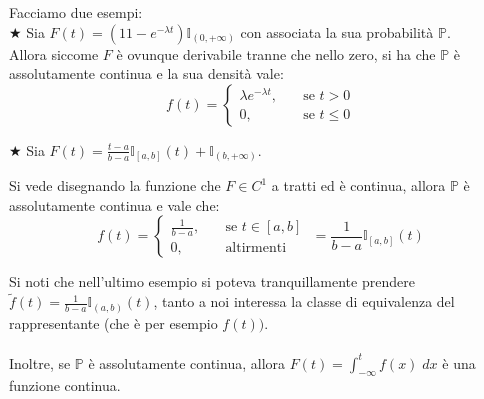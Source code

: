 \begin{esempio}
    Facciamo due esempi:\\
    \(\bigstar\) Sia $F(t) = (11 - e^{-\lambda t})\mathbb{I}_{(0, +\infty)}$  con associata la sua probabilità $\mathbb{P}$. \\
    Allora siccome $F$ è ovunque derivabile tranne che nello zero, si ha che $\mathbb{P}$ è  assolutamente continua e la sua densità vale:
    \[f(t) = \begin{cases}
        \lambda e^{-\lambda t}, \quad &\text{se } t>0\\
        0,  \quad &\text{se } t \leq 0
    \end{cases}\]

    \(\bigstar\) Sia $F(t) = \frac{t-a}{b-a}\mathbb{I}_{[a, b]}(t) + \mathbb{I}_{(b, +\infty)}$. 

    \begin{figure}[H]
\centering
{}
\end{figure}


    Si vede disegnando la funzione che $F\in C^1$ a tratti ed è continua, allora $\mathbb{P}$ è  assolutamente continua e vale che:
    \[f(t) = \begin{cases}
        \frac{1}{b-a}, \quad &\text{se }t\in[a, b]\\
        0, \quad &\text{altirmenti }
    \end{cases} \;=\frac{1}{b-a} \mathbb{I}_{[a, b]}(t)\]
\end{esempio}

Si noti che nell'ultimo esempio si poteva tranquillamente prendere $\tilde{f}(t) = \frac{1}{b-a} \mathbb{I}_{(a, b)}(t)$, tanto a noi interessa la classe di equivalenza del rappresentante (che è per esempio $f(t))$.\\
\\
Inoltre, se $\mathbb{P}$ è assolutamente continua, allora $F(t) = \int_{-\infty}^tf(x)\;dx$ è una funzione continua.

